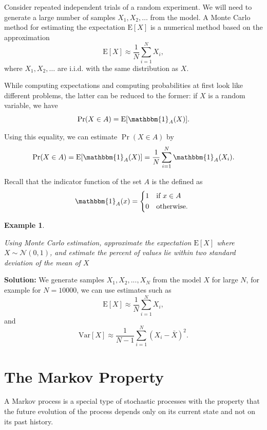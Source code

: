 \documentclass[landscape, 20pt]{extreport}
\theoremstyle{definition}
\theoremstyle{definition}
\newtheorem{example}{Example}[chapter]
\theoremstyle{definition}
\theoremstyle{definition}
\theoremstyle{remark}
\begin{document}
Consider repeated independent trials of a random experiment. We will
need to generate a large number of samples \(X_1, X_2, \ldots\) from the
model. A Monte Carlo method for estimating the expectation
\(\mathrm{E}[ X ]\) is a numerical method based on the approximation
\[\mathrm{E}[ X] \approx \frac{1}{N}\sum_{i=1}^N X_i,\] where
\(X_1, X_2, \ldots\) are i.i.d. with the same distribution as \(X\).

While computing expectations and computing probabilities at first look
like different problems, the latter can be reduced to the former: if \(X\)
is a random variable, we have
\[\Pr(X \in A) = \mathrm{E}[\mathbbm{1}_A(X)].\]

Using this equality, we can estimate \(\Pr(X \in A)\) by
\[\Pr(X \in A) = \mathrm{E}[\mathbbm{1}_A(X)] = \frac{1}{N}\sum_{i=1}^N \mathbbm{1}_A(X_i).\]

Recall that the indicator function of the set \(A\) is the defined as
\[\mathbbm{1}_A(x) =
\begin{cases*}
     1          & if $x \in A $ \\
      0        & otherwise.
\end{cases*}\]

\newpage \begin{example}
\protect\hypertarget{exm:unlabeled-div-66}{}\label{exm:unlabeled-div-66}

\emph{Using Monte Carlo estimation, approximate the
expectation \(\mathrm{E}[X]\) where \(X \sim \mathcal{N}(0,1)\), and
estimate the percent of values lie within two standard deviation of the
mean of \(X\)}

\end{example}

\textbf{Solution:} We generate samples \(X_1,X_2,...,X_N\) from the model \(X\)
for large \(N\), for example for \(N = 10000\), we can use estimates such as
\[\mathrm{E}[X] \approx \frac{1}{N}\sum_{i=1}^N X_i,\] and
\[\mathrm{Var}[X] \approx \frac{1}{N-1}\sum_{i=1}^N (X_i - \bar{X})^2.\]

\hypertarget{the-markov-property}{%
\section{The Markov Property}\label{the-markov-property}}

A Markov process is a special type of stochastic processes with the
property that the future evolution of the process depends only on its
current state and not on its past history.
\end{document}
